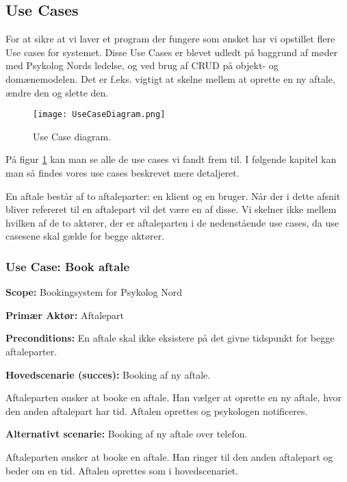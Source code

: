 \subsection{Use Cases}
For at sikre at vi laver et program der fungere som ønsket har vi opstillet flere Use cases for systemet.
Disse Use Cases er blevet udledt på baggrund af møder med Psykolog Nords ledelse, og ved brug af CRUD på objekt- og domænemodelen. Det er f.eks. vigtigt at skelne mellem at oprette en ny aftale, ændre den og slette den. 

\begin{figure}
	\centering
  		\texttt{[image: UseCaseDiagram.png]}
  \caption{Use Case diagram.}
  \label{fig:UseCaseDiagram}
\end{figure}

På figur \ref{fig:UseCaseDiagram} kan man se alle de use cases vi fandt frem til. 
I følgende kapitel kan man så findes vores use cases beskrevet mere detaljeret.

En aftale består af to aftaleparter: en klient og en bruger. 
Når der i dette afsnit bliver refereret til en aftalepart vil det være en af disse. 
Vi skelner ikke mellem hvilken af de to aktører, der er aftaleparten i de nedenstående use cases, da use casesene skal gælde for begge aktører.

\subsubsection{Use Case: Book aftale}
{\setlength{\parindent}{0cm}
\textbf{Scope:} Bookingsystem for Psykolog Nord

\textbf{Primær Aktør:} Aftalepart

\textbf{Preconditions:} En aftale skal ikke eksistere på det givne tidspunkt for begge aftaleparter.

\textbf{Hovedscenarie (succes):} Booking af ny aftale.

Aftaleparten ønsker at booke en aftale. 
Han vælger at oprette en ny aftale, hvor den anden aftalepart har tid. 
Aftalen oprettes og psykologen notificeres.

\textbf{Alternativt scenarie:} Booking af ny aftale over telefon.

Aftaleparten ønsker at booke en aftale. Han ringer til den anden aftalepart og beder om en tid. Aftalen oprettes som i hovedscenariet.
}

